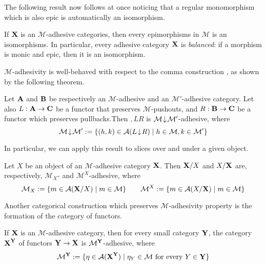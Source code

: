 The following result now follows at once noticing that a regular monomorphism which is also epic is automatically an isomorphism.

\begin{corollary}\label{prop:bal}
If $\textbf {\textup{X}}$ is an $\mathcal{M}$-adhesive categories, then every epimorphisms in $\mathcal{M}$ is an isomorphisms. In particular, every adhesive category $\textbf {\textup{X}}$ is \emph{balanced}: if a morphism is monic and epic, then it is an isomorphism.
\end{corollary}


$\mathcal{M}$-adhesivity is well-behaved with respect to  the comma construction \cite{mac2013categories}, as shown by the following theorem.
\begin{theorem}\label{lem:comma}
	Let $\textbf {\textup{A}}$ and $\textbf {\textup{B}}$ be respectively an $\mathcal{M}$-adhesive and an $\mathcal{M}'$-adhesive category. Let also $L:\textbf {\textup{A}}\rightarrow \textbf {\textup{C}}$ be a functor that preserves $\mathcal{M}$-pushouts, and  $R:\textbf {\textup{B}}\rightarrow \textbf {\textup{C}}$ be a functor which preserves pullbacks.Then $\comma{L}{R}$ is $\mathcal{M}\hspace{1pt} {\downarrow}\hspace{1pt} \mathcal{M'}$-adhesive, where 
	\[
	\mathcal{M}\hspace{1pt} {\downarrow}\hspace{1pt} \mathcal{M}':=\{(h,k)\in \mathcal{A}(L\hspace{1pt} {\downarrow}\hspace{1pt} R) \mid h\in \mathcal{M}, k\in \mathcal{M}'\}\]
\end{theorem}

In particular, we can apply this result to slices over and under a given object.

\begin{corollary}\label{cor:slice}
	Let  $X$ be an object of an $\mathcal{M}$-adhesive category $\textbf {\textup{X}}$. Then  $\textbf {\textup{X}}/X$ and $X/\textbf {\textup{X}}$ are, respectively, $\mathcal{M}_X$- and $\mathcal{M}^X$-adhesive, where
	\[\mathcal{M}_X:=\{m\in  \mathcal{A}(\textbf {\textup{X}}/X) \mid m\in \mathcal{M} \} \qquad \mathcal{M}^X:=\{m\in  \mathcal{A}(X/\textbf {\textup{X}}) \mid m\in \mathcal{M} \}\]
\end{corollary}


Another categorical construction which preserves $\mathcal{M}$-adhesivity property is the formation of the category of functors.

\begin{theorem}\label{thm:functors}
If $\textbf {\textup{X}}$ is an $\mathcal{M}$-adhesive category, then for every small category $\textbf {\textup{Y}}$, the category $\textbf {\textup{X}}^\textbf {\textup{Y}}$  of functors $\textbf {\textup{Y}}\to \textbf {\textup{X}}$ is $\mathcal{M}^{\textbf {\textup{Y}}}$-adhesive, where
\[\mathcal{M}^{\textbf {\textup{Y}}}:=\{\eta \in \mathcal{A}(\textbf {\textup{X}}^\textbf {\textup{Y}}) \mid \eta_Y \in \mathcal{M} \text{ for every } Y\in \textbf {\textup{Y}}\}\]
\end{theorem}

